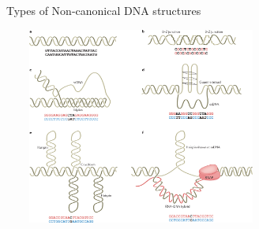 \documentclass{beamer}
\begin{document}
		
		

	\begin{frame}{Types of Non-canonical DNA structures}
		
		\centering
		\includegraphics[width=9cm, height=6.5cm]{nonb_types.png}
	
	
	\end{frame}
\end{document}
